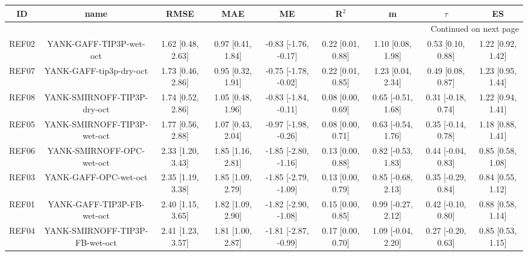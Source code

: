 \documentclass{article}
\begin{document}
\begin{center}
\scriptsize
\begin{longtable}{|ccccccccc|}
\toprule
    ID &                            name &               RMSE &                MAE &                    ME &              R$^2$ &                   m &              $\tau$ &                 ES \\
\midrule
\endhead
\midrule
\multicolumn{9}{r}{{Continued on next page}} \\
\midrule
\endfoot

\bottomrule
\endlastfoot
 REF02 &         YANK-GAFF-TIP3P-wet-oct &  1.62 [0.48, 2.63] &  0.97 [0.41, 1.84] &  -0.83 [-1.76, -0.17] &  0.22 [0.01, 0.88] &   1.10 [0.08, 1.98] &   0.53 [0.10, 0.88] &  1.22 [0.92, 1.42] \\
 REF07 &         YANK-GAFF-tip3p-dry-oct &  1.73 [0.46, 2.86] &  0.95 [0.32, 1.91] &  -0.75 [-1.78, -0.02] &  0.22 [0.01, 0.85] &   1.23 [0.04, 2.34] &   0.49 [0.08, 0.87] &  1.23 [0.95, 1.44] \\
 REF08 &     YANK-SMIRNOFF-TIP3P-dry-oct &  1.74 [0.52, 2.86] &  1.05 [0.48, 1.96] &  -0.83 [-1.84, -0.11] &  0.08 [0.00, 0.69] &  0.65 [-0.51, 1.68] &  0.31 [-0.18, 0.74] &  1.22 [0.94, 1.41] \\
 REF05 &     YANK-SMIRNOFF-TIP3P-wet-oct &  1.77 [0.56, 2.88] &  1.07 [0.43, 2.04] &  -0.97 [-1.98, -0.26] &  0.08 [0.00, 0.71] &  0.63 [-0.54, 1.76] &  0.35 [-0.14, 0.78] &  1.18 [0.88, 1.41] \\
 REF06 &       YANK-SMIRNOFF-OPC-wet-oct &  2.33 [1.20, 3.43] &  1.85 [1.16, 2.81] &  -1.85 [-2.80, -1.16] &  0.13 [0.00, 0.88] &  0.82 [-0.53, 1.83] &  0.44 [-0.04, 0.83] &  0.85 [0.58, 1.08] \\
 REF03 &           YANK-GAFF-OPC-wet-oct &  2.35 [1.19, 3.38] &  1.85 [1.09, 2.79] &  -1.85 [-2.79, -1.09] &  0.13 [0.00, 0.79] &  0.85 [-0.68, 2.13] &  0.35 [-0.29, 0.84] &  0.84 [0.55, 1.12] \\
 REF01 &      YANK-GAFF-TIP3P-FB-wet-oct &  2.40 [1.15, 3.65] &  1.82 [1.09, 2.90] &  -1.82 [-2.90, -1.08] &  0.15 [0.00, 0.85] &  0.99 [-0.27, 2.12] &  0.42 [-0.10, 0.80] &  0.88 [0.58, 1.14] \\
 REF04 &  YANK-SMIRNOFF-TIP3P-FB-wet-oct &  2.41 [1.23, 3.57] &  1.81 [1.00, 2.87] &  -1.81 [-2.87, -0.99] &  0.17 [0.00, 0.70] &  1.09 [-0.04, 2.20] &  0.27 [-0.20, 0.63] &  0.85 [0.53, 1.15] \\
\end{longtable}
\end{center}
\end{document}
